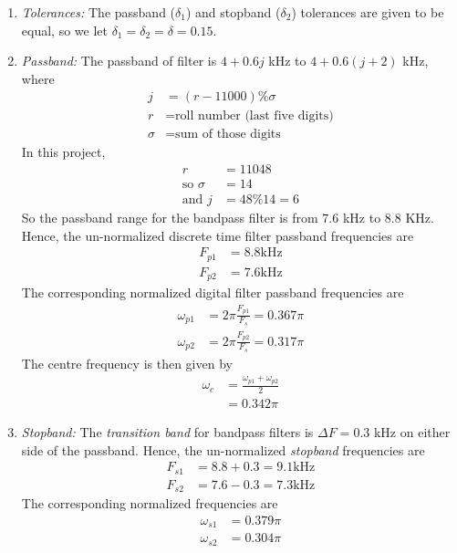 \documentclass{article}
\begin{document}
\begin{enumerate}
\item {\em Tolerances:}  The passband ($\delta_1$) and stopband ($\delta_2$) tolerances are given to
be equal, so we let $\delta_1 = \delta_2 = \delta = 0.15$.
\item {\em Passband:}  The passband of filter is $4+0.6j$ kHz to $4+0.6(j+2)$ kHz, where 
\begin{align}
    j &= (r-11000)\%\sigma \\
    r &= \text{roll number (last five digits)} \\
    \sigma &= \text{sum of those digits}
\end{align}
In this project,
\begin{align}
    r &= 11048 \\
 \text{so }   \sigma &= 14 \\
  \text{and }  j &= 48 \% 14 = 6
\end{align}
So the passband range for the bandpass filter is from $7.6$ kHz to $8.8$ KHz. Hence, the un-normalized discrete time filter passband frequencies are 
\begin{align}
    F_{p1} &= 8.8 \text{kHz} \\
    F_{p2} &= 7.6 \text{kHz}
\end{align}
The corresponding normalized digital filter passband frequencies are 
\begin{align}
    \omega_{p1} &= 2\pi\frac{F_{p1}}{F_s}  = 0.367\pi \\
    \omega_{p2} &= 2\pi\frac{F_{p2}}{F_s}  = 0.317 \pi
\end{align}
The centre frequency is then given by  
\begin{align}
    \omega_c &= \frac{\omega_{p1} + \omega_{p2}}{2} \\
             &= 0.342\pi
\end{align}
\item {\em Stopband:}  The {\em transition band} for bandpass filters is $\Delta F = 0.3$ kHz on either side of the passband.
Hence, the un-normalized {\em stopband} frequencies are 
\begin{align}
    F_{s1} &= 8.8 + 0.3 = 9.1 \text{kHz} \\
    F_{s2} &= 7.6 - 0.3 = 7.3 \text{kHz}
\end{align}
The corresponding normalized frequencies are 
\begin{align}
    \omega_{s1} &= 0.379 \pi \\
    \omega_{s2} &=  0.304 \pi
\end{align}
\end{enumerate}
\end{document}
